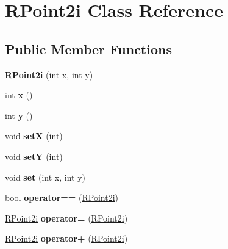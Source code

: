 \hypertarget{classRPoint2i}{
\section{RPoint2i Class Reference}
\label{classRPoint2i}
}
\subsection*{Public Member Functions}
\begin{DoxyCompactItemize}
\item 
\hypertarget{classRPoint2i_aa4feadb6fd1a325999992eb3a848833f}{
{\bfseries RPoint2i} (int x, int y)}
\label{classRPoint2i_aa4feadb6fd1a325999992eb3a848833f}

\item 
\hypertarget{classRPoint2i_aa4eb37808d3385eabd7b7afcea2e51a0}{
int {\bfseries x} ()}
\label{classRPoint2i_aa4eb37808d3385eabd7b7afcea2e51a0}

\item 
\hypertarget{classRPoint2i_a8bd8470c25a32cd8294d8c48d61caddd}{
int {\bfseries y} ()}
\label{classRPoint2i_a8bd8470c25a32cd8294d8c48d61caddd}

\item 
\hypertarget{classRPoint2i_a632d2f16ae8af7b8f005788cda24300f}{
void {\bfseries setX} (int)}
\label{classRPoint2i_a632d2f16ae8af7b8f005788cda24300f}

\item 
\hypertarget{classRPoint2i_abe152656ead3df5f1d66e0bfa029ecdc}{
void {\bfseries setY} (int)}
\label{classRPoint2i_abe152656ead3df5f1d66e0bfa029ecdc}

\item 
\hypertarget{classRPoint2i_adc82f0451699260019d1e1acd296803a}{
void {\bfseries set} (int x, int y)}
\label{classRPoint2i_adc82f0451699260019d1e1acd296803a}

\item 
\hypertarget{classRPoint2i_aec6c8fd14340ded637491d808df04546}{
bool {\bfseries operator==} (\hyperlink{classRPoint2i}{RPoint2i})}
\label{classRPoint2i_aec6c8fd14340ded637491d808df04546}

\item 
\hypertarget{classRPoint2i_a610eabfd188b74ffb61cd446bcf79e3f}{
\hyperlink{classRPoint2i}{RPoint2i} {\bfseries operator=} (\hyperlink{classRPoint2i}{RPoint2i})}
\label{classRPoint2i_a610eabfd188b74ffb61cd446bcf79e3f}

\item 
\hypertarget{classRPoint2i_a71d9ed3107344a67cd5a4517252f47f0}{
\hyperlink{classRPoint2i}{RPoint2i} {\bfseries operator+} (\hyperlink{classRPoint2i}{RPoint2i})}
\label{classRPoint2i_a71d9ed3107344a67cd5a4517252f47f0}


\end{DoxyCompactItemize}
